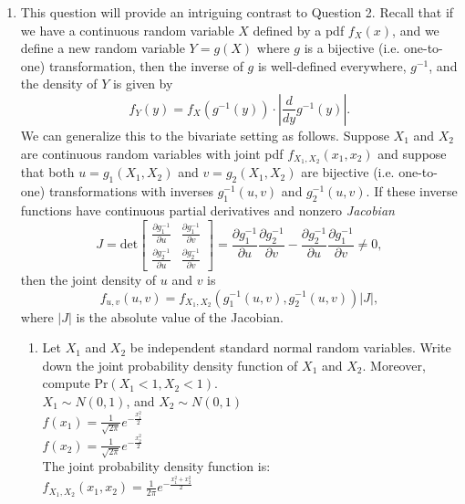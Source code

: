 \documentclass[11pt]{article}
\newcommand{\pr}{\text{Pr}}
\begin{document}
\begin{enumerate}[label=\textbf{Question \arabic*:},start=1]
\begin{enumerate}
\end{enumerate}






\item 
This question will provide an intriguing contrast to Question 2. Recall that if we have a continuous random variable $X$ defined by a pdf $f_X(x)$, and we define a new random variable $Y = g(X)$ where $g$ is a bijective (i.e. one-to-one) transformation, then the inverse of $g$ is well-defined everywhere, $g^{-1}$, and the density of $Y$ is given by $$f_Y(y) = f_X(g^{-1}(y))\cdot \left| \frac d{dy} g^{-1}(y)\right|.$$ We can generalize this to the bivariate setting as follows. Suppose $X_1$ and $X_2$ are continuous random variables with joint pdf $f_{X_1,X_2}(x_1,x_2)$ and suppose that both $u = g_1(X_1,X_2)$ and $v = g_2(X_1,X_2)$ are bijective (i.e. one-to-one) transformations with inverses $g_1^{-1}(u,v)$ and $g_2^{-1}(u,v)$. If these inverse functions have continuous partial derivatives and nonzero {\em Jacobian} 
\[
J = \text{det}
\begin{bmatrix}
	\frac {\partial g_1^{-1}}{\partial u}	& \frac {\partial g_1^{-1}}{\partial v} \\
	\frac {\partial g_2^{-1}}{\partial u}	& \frac {\partial g_2^{-1}}{\partial v}
\end{bmatrix}
= \frac {\partial g_1^{-1}}{\partial u} \frac {\partial g_2^{-1}}{\partial v} - \frac {\partial g_2^{-1}}{\partial u} \frac {\partial g_1^{-1}}{\partial v} \neq 0,
\]
then the joint density of $u$ and $v$ is $$f_{u,v}(u,v) = f_{X_1,X_2}\left( g_1^{-1}(u,v), g_2^{-1}(u,v)\right) |J|,$$ where $|J|$ is the absolute value of the Jacobian.

\begin{enumerate}
  \item Let $X_1$ and $X_2$ be independent standard normal random variables. Write down the joint probability density function of $X_1$ and $X_2$. Moreover, compute $\pr(X_1<1,X_2<1)$.\\
  
  $X_1 \sim N(0, 1)$, and $X_2 \sim N(0, 1)$\\
  $f(x_1) = \frac{1}{\sqrt{2 \pi}} e^{-\frac{x_1^2}{2}} $ \\
  $f(x_2) = \frac{1}{\sqrt{2 \pi}} e^{-\frac{x_2^2}{2}}  $ \\
  The joint probability density function is: \\
  $f_{X_1, X_2}(x_1, x_2) = \frac{1}{2 \pi} e^{-\frac{x_1^2 + x_2^2}{2}}$\\
  

\end{enumerate}
\end{enumerate}
\end{document}
